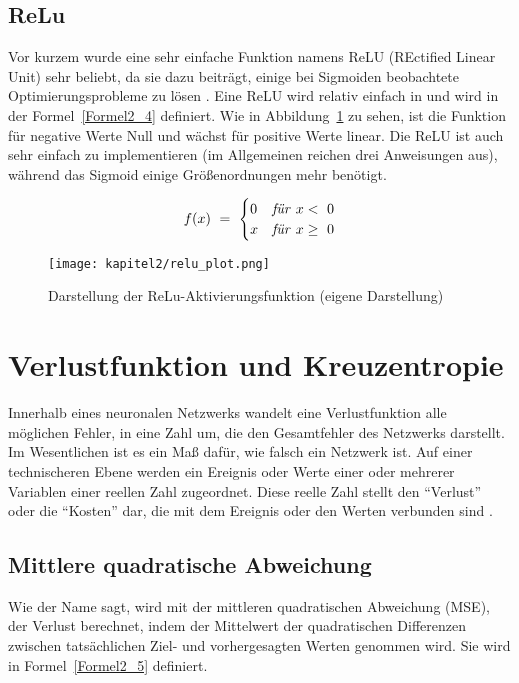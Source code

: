 \subsection{ReLu}
Vor kurzem wurde eine sehr einfache Funktion namens ReLU (REctified Linear Unit) sehr beliebt, da sie dazu beiträgt, einige bei Sigmoiden beobachtete Optimierungsprobleme zu lösen \cite*[S. 11]{AntonioGuili;AmitaKapoor;SujitPal2019}. Eine ReLU wird relativ einfach in und wird in der Formel~\ref{Formel2_4} definiert. Wie in Abbildung~\ref{Kap2:ReLu_plot} zu sehen, ist die Funktion für negative Werte Null und wächst für positive Werte linear. Die ReLU ist auch sehr einfach zu implementieren (im Allgemeinen reichen drei Anweisungen aus), während das Sigmoid einige Größenordnungen mehr benötigt.

\begin{equation} \label{Formel2_4}
  f( x) \ =\ \begin{cases}
    0 & \textrm{\textit{für}}\ x < \ 0   \\
    x & \textrm{\textit{für}}\ x\geq \ 0
  \end{cases}
\end{equation}

\begin{figure}[H]
  \centering
  \texttt{[image: kapitel2/relu\_plot.png]}
  \caption[Darstellung der ReLu-Aktivierungsfunktion]{Darstellung der ReLu-Aktivierungsfunktion (eigene Darstellung)}
  \label{Kap2:ReLu_plot}
\end{figure}




\section{Verlustfunktion und Kreuzentropie}
Innerhalb eines neuronalen Netzwerks wandelt eine Verlustfunktion alle möglichen Fehler, in eine Zahl um, die den Gesamtfehler des Netzwerks darstellt. Im Wesentlichen ist es ein Maß dafür, wie falsch ein Netzwerk ist. Auf einer technischeren Ebene werden ein Ereignis oder Werte einer oder mehrerer Variablen einer reellen Zahl zugeordnet. Diese reelle Zahl stellt  den \enquote{Verlust} oder die \enquote{Kosten} dar, die mit dem Ereignis oder den Werten verbunden sind \cite*[S. 41]{Taylor2017}.

\subsection{Mittlere quadratische Abweichung}
Wie der Name sagt, wird mit der mittleren quadratischen Abweichung (MSE), der Verlust berechnet, indem der Mittelwert der quadratischen Differenzen zwischen tatsächlichen Ziel- und vorhergesagten Werten genommen wird. Sie wird in Formel~\ref{Formel2_5} definiert.

